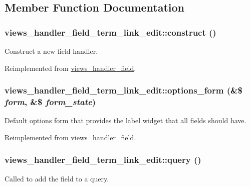 \subsection{Member Function Documentation}
\hypertarget{classviews__handler__field__term__link__edit_aaad58c0af52bdc78aa28b6571340bb07}{
\subsubsection[{construct}]{\setlength{\rightskip}{0pt plus 5cm}views\_\-handler\_\-field\_\-term\_\-link\_\-edit::construct ()}}
\label{classviews__handler__field__term__link__edit_aaad58c0af52bdc78aa28b6571340bb07}
Construct a new field handler. 

Reimplemented from \hyperlink{classviews__handler__field_a3d50050864c255b71c842972a45d39f6}{views\_\-handler\_\-field}.\hypertarget{classviews__handler__field__term__link__edit_a3673c12b0def82d67381ae9b4c26955e}{
\subsubsection[{options\_\-form}]{\setlength{\rightskip}{0pt plus 5cm}views\_\-handler\_\-field\_\-term\_\-link\_\-edit::options\_\-form (\&\$ {\em form}, \/  \&\$ {\em form\_\-state})}}
\label{classviews__handler__field__term__link__edit_a3673c12b0def82d67381ae9b4c26955e}
Default options form that provides the label widget that all fields should have. 

Reimplemented from \hyperlink{classviews__handler__field_a0435d161922b7b4b84f02a2e79bb947a}{views\_\-handler\_\-field}.\hypertarget{classviews__handler__field__term__link__edit_a44535334ed9b5453f0b839621e1f560a}{
\subsubsection[{query}]{\setlength{\rightskip}{0pt plus 5cm}views\_\-handler\_\-field\_\-term\_\-link\_\-edit::query ()}}
\label{classviews__handler__field__term__link__edit_a44535334ed9b5453f0b839621e1f560a}
Called to add the field to a query. 

